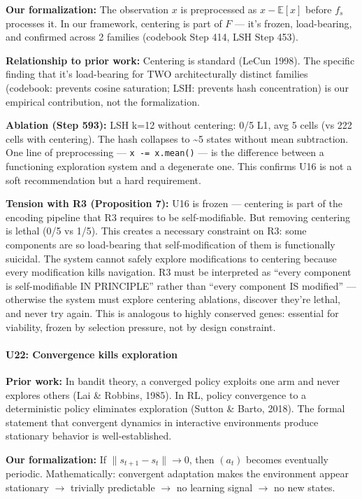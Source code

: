 \documentclass[
  11pt,
]{article}
\begin{document}
\textbf{Our formalization:} The observation \(x\) is preprocessed as
\(x - \mathbb{E}[x]\) before \(f_s\) processes it. In our framework,
centering is part of \(F\) --- it's frozen, load-bearing, and confirmed
across 2 families (codebook Step 414, LSH Step 453).

\textbf{Relationship to prior work:} Centering is standard (LeCun 1998).
The specific finding that it's load-bearing for TWO architecturally
distinct families (codebook: prevents cosine saturation; LSH: prevents
hash concentration) is our empirical contribution, not the
formalization.

\textbf{Ablation (Step 593):} LSH k=12 without centering: 0/5 L1, avg 5
cells (vs 222 cells with centering). The hash collapses to
\textasciitilde5 states without mean subtraction. One line of
preprocessing --- \texttt{x\ -=\ x.mean()} --- is the difference between
a functioning exploration system and a degenerate one. This confirms U16
is not a soft recommendation but a hard requirement.

\textbf{Tension with R3 (Proposition 7):} U16 is frozen --- centering is
part of the encoding pipeline that R3 requires to be self-modifiable.
But removing centering is lethal (0/5 vs 1/5). This creates a necessary
constraint on R3: some components are so load-bearing that
self-modification of them is functionally suicidal. The system cannot
safely explore modifications to centering because every modification
kills navigation. R3 must be interpreted as ``every component is
self-modifiable IN PRINCIPLE'' rather than ``every component IS
modified'' --- otherwise the system must explore centering ablations,
discover they're lethal, and never try again. This is analogous to
highly conserved genes: essential for viability, frozen by selection
pressure, not by design constraint.

\paragraph{U22: Convergence kills
exploration}\label{u22-convergence-kills-exploration}

\textbf{Prior work:} In bandit theory, a converged policy exploits one
arm and never explores others (Lai \& Robbins, 1985). In RL, policy
convergence to a deterministic policy eliminates exploration (Sutton \&
Barto, 2018). The formal statement that convergent dynamics in
interactive environments produce stationary behavior is
well-established.

\textbf{Our formalization:} If \(\|s_{t+1} - s_t\| \to 0\), then
\((a_t)\) becomes eventually periodic. Mathematically: convergent
adaptation makes the environment appear stationary \(\to\) trivially
predictable \(\to\) no learning signal \(\to\) no new states.
\end{document}
